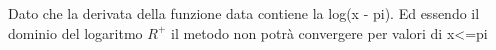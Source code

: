 
Dato che la derivata della funzione data contiene la log(x - pi).
Ed essendo il dominio del logaritmo \(R^+\) il metodo non potrà convergere per valori di x<=pi
